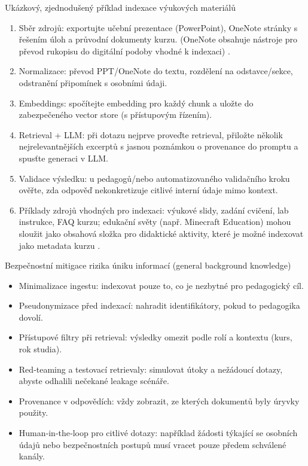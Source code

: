 \documentclass{report}%
\begin{document}
Ukázkový, zjednodušený příklad indexace výukových materiálů
\begin{enumerate}
  \item Sběr zdrojů: exportujte učební prezentace (PowerPoint), OneNote stránky s řešením úloh a průvodní dokumenty kurzu. (OneNote obsahuje nástroje pro převod rukopisu do digitální podoby vhodné k indexaci) \cite{kb_ai_101_tipu_pdf_04e4a115_page_8_1}.
  \item Normalizace: převod PPT/OneNote do textu, rozdělení na odstavce/sekce, odstranění připomínek s osobními údaji.
  \item Embeddings: spočítejte embedding pro každý chunk a uložte do zabezpečeného vector store (s přístupovým řízením).
  \item Retrieval + LLM: při dotazu nejprve proveďte retrieval, přiložte několik nejrelevantnějších excerptů s jasnou poznámkou o provenance do promptu a spusťte generaci v LLM.
  \item Validace výsledku: u pedagogů/nebo automatizovaného validačního kroku ověřte, zda odpověď nekonkretizuje citlivé interní údaje mimo kontext.
  \item Příklady zdrojů vhodných pro indexaci: výukové slidy, zadání cvičení, lab instrukce, FAQ kurzu; edukační světy (např. Minecraft Education) mohou sloužit jako obsahová složka pro didaktické aktivity, které je možné indexovat jako metadata kurzu \cite{kb_ai_101_tipu_pdf_04e4a115_page_15_2}.
\end{enumerate}

Bezpečnostní mitigace rizika úniku informací (general background knowledge)
\begin{itemize}
  \item Minimalizace ingestu: indexovat pouze to, co je nezbytné pro pedagogický cíl.
  \item Pseudonymizace před indexací: nahradit identifikátory, pokud to pedagogika dovolí.
  \item Přístupové filtry při retrieval: výsledky omezit podle rolí a kontextu (kurs, rok studia).
  \item Red‑teaming a testovací retrievaly: simulovat útoky a nežádoucí dotazy, abyste odhalili nečekané leakage scénáře.
  \item Provenance v odpovědích: vždy zobrazit, ze kterých dokumentů byly úryvky použity.
  \item Human‑in‑the‑loop pro citlivé dotazy: například žádosti týkající se osobních údajů nebo bezpečnostních postupů musí vracet pouze předem schválené kanály.
\end{itemize}
\end{document}

